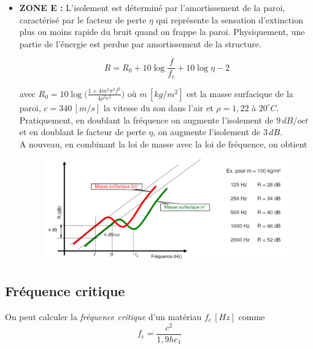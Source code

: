 \documentclass[11pt]{report}
\begin{document}
\begin{itemize}
\item \textbf{ZONE E :} L'isolement est déterminé par l'amortissement de la paroi, caractérisé par le facteur de perte $\eta$ qui représente la sensation d'extinction plus ou moins rapide du bruit quand on frappe la paroi. Physiquement, une partie de l'énergie est perdue par amortissement de la structure.

$$R = R_0 + 10 \log \frac{f}{f_c} + 10 \log \eta - 2$$

avec $R_0 =10 \log \Big(\frac{1+4m^2 \pi^2 f^2}{4 \rho^2 c^2}\Big)$ où $m\,[kg/m^2]$ est la masse surfacique de la paroi, $c=340 \, [m/s]$ la vitesse du son dans l'air et $\rho=1,22$ à $20^{\circ}C$.\\

Pratiquement, en doublant la fréquence on augmente l'isolement de $9\,dB/oct$ et en doublant le facteur de perte $\eta$, on augmente l'isolement de  $3\,dB$.\\

A nouveau, en combinant la loi de masse avec la loi de fréquence, on obtient
\begin{figure}[h]
\centering
\includegraphics[width=0.7\linewidth]{freq}
\end{figure}
\end{itemize}




\subsection{Fréquence critique}
On peut calculer la \textit{fréquence critique} d'un matériau $f_c\,[Hz]$ comme
$$f_c = \frac{c^2}{1,9 h c_1}$$
\end{document}
